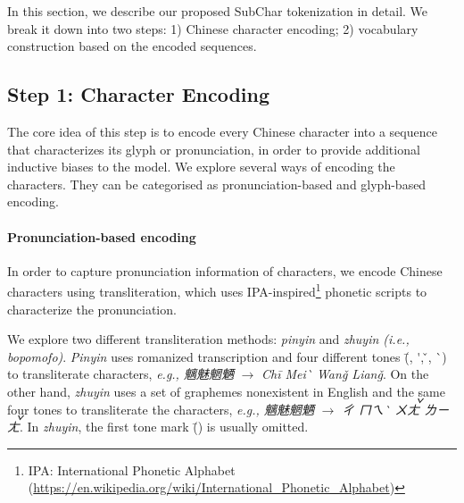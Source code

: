 \label{sec:method}

In this section, we describe our proposed SubChar tokenization in detail. We break it down into two steps: 1) Chinese character encoding; 2) vocabulary construction based on the encoded sequences. 



\subsection{Step 1: Character Encoding}
\label{sec:char_encode}

The core idea of this step is to encode every Chinese character into a sequence that characterizes its glyph or pronunciation, in order to provide additional inductive biases to the model. We explore several ways of encoding the characters.
They can be categorised as pronunciation-based and glyph-based encoding.

% 

\paragraph{Pronunciation-based encoding}
In order to capture pronunciation information of characters, we encode Chinese characters using transliteration, which uses IPA-inspired\footnote{IPA: International Phonetic Alphabet (\url{https://en.wikipedia.org/wiki/International_Phonetic_Alphabet})} phonetic scripts to characterize the pronunciation.

We explore two different transliteration methods: \textit{pinyin} and \textit{zhuyin (i.e., bopomofo)}.  
\textit{Pinyin} uses romanized transcription and four different tones (\={}, \'{}, \v{}, \`{})
to transliterate characters, \textit{e.g., 魑魅魍魉} $\rightarrow$ \textit{Chi\={} Mei\`{} Wang\v{} Liang\v{}}. 
On the other hand, \textit{zhuyin} uses a set of graphemes nonexistent in English and the same four tones to transliterate the characters, \textit{e.g., 魑魅魍魉} $\rightarrow$ \textit{ㄔ ㄇㄟ\`{} ㄨㄤ\v{} ㄌㄧㄤ\v{}}. 
In \textit{zhuyin}, the first tone mark (\={}) is usually omitted.

